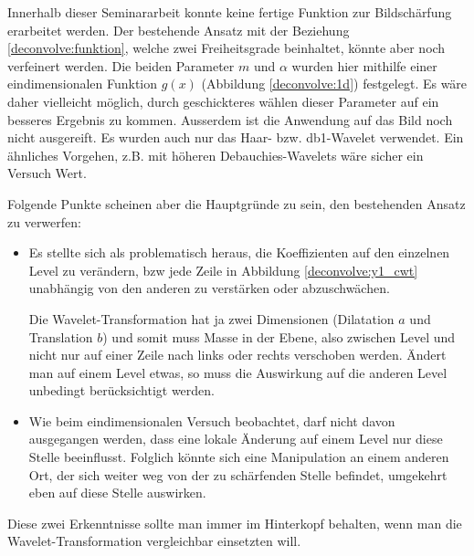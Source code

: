 Innerhalb dieser Seminararbeit konnte keine fertige Funktion zur Bildschärfung erarbeitet werden.
Der bestehende Ansatz mit der Beziehung \eqref{deconvolve:funktion}, welche zwei Freiheitsgrade beinhaltet, könnte aber noch verfeinert werden.
Die beiden Parameter $m$ und $\alpha$ wurden hier mithilfe einer eindimensionalen Funktion $g(x)$ (Abbildung \ref{deconvolve:1d}) festgelegt.
Es wäre daher vielleicht möglich, durch geschickteres wählen dieser Parameter auf ein besseres Ergebnis zu kommen.
Ausserdem ist die Anwendung auf das Bild noch nicht ausgereift.
Es wurden auch nur das Haar- bzw. db1-Wavelet verwendet.
Ein ähnliches Vorgehen, z.B. mit höheren Debauchies-Wavelets wäre sicher ein Versuch Wert.

Folgende Punkte scheinen aber die Hauptgründe zu sein, den bestehenden Ansatz zu verwerfen:
\begin{itemize}
	\item Es stellte sich als problematisch heraus, die Koeffizienten auf den einzelnen Level zu verändern, bzw jede Zeile in Abbildung \ref{deconvolve:y1_cwt} unabhängig von den anderen zu verstärken oder abzuschwächen.
	
	Die Wavelet-Transformation hat ja zwei Dimensionen (Dilatation $a$ und Translation $b$) und somit muss \glqq Masse \grqq{} in der Ebene, also zwischen Level und nicht nur auf einer Zeile nach links oder rechts verschoben werden.
	Ändert man auf einem Level etwas, so muss die Auswirkung auf die anderen Level unbedingt berücksichtigt werden.
	\item Wie beim eindimensionalen Versuch beobachtet, darf nicht davon ausgegangen werden, dass eine lokale Änderung auf einem Level nur diese Stelle beeinflusst.
	Folglich könnte sich eine Manipulation an einem anderen Ort, der sich weiter weg von der zu schärfenden Stelle befindet, umgekehrt eben auf diese Stelle auswirken. 
\end{itemize}

Diese zwei Erkenntnisse sollte man immer im Hinterkopf behalten, wenn man die Wavelet-Transformation vergleichbar einsetzten will.



